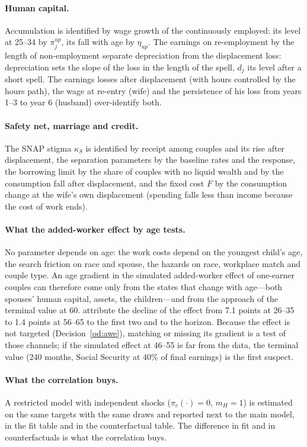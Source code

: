 \documentclass[11pt]{article}
\newcommand{\1}{\mathbf{1}}
\begin{document}
\paragraph{Human capital.} Accumulation is identified by wage growth of the continuously employed: its level at 25--34
by $\pi^{up}_j$, its fall with age by $\eta_{up}$. The
earnings on re-employment by the length of non-employment separate depreciation from the displacement loss:
depreciation sets the slope of the loss in the length of the spell, $d_j$ its level after a short spell. The earnings
losses after displacement (with hours controlled by the hours path), the wage at re-entry (wife) and the persistence of
his loss from years 1--3 to year 6 (husband) over-identify both.

\paragraph{Safety net, marriage and credit.} The SNAP stigma $\kappa_S$ is identified by receipt among couples and its
rise after displacement, the separation parameters by the baseline rates and the response, the borrowing limit by the
share of couples with no liquid wealth and by the consumption fall after displacement, and the fixed cost $F$ by the
consumption change at the wife's own displacement (spending falls less than income because the cost of work ends).

\paragraph{What the added-worker effect by age tests.} No parameter depends on age: the work costs depend on the
youngest child's age, the search friction on race and spouse, the hazards on race, workplace match and couple type.
An age gradient in the simulated added-worker effect of one-earner couples can therefore come only from the states that
change with age---both spouses' human capital, assets, the children---and from the approach of the terminal value at 60.
\citet{bacher2025joint} attribute the decline of the effect from 7.1 points at 26--35 to 1.4 points at 56--65 to the
first two and to the horizon. Because the effect is not targeted (Decision~\ref{od:awe}), matching or missing its
gradient is a test of those channels; if the simulated effect at 46--55 is far from the data, the terminal value (240
months, Social Security at 40\% of final earnings) is the first suspect.

\paragraph{What the correlation buys.} A restricted model with independent shocks ($\pi_c(\cdot) = 0$, $m_H = 1$) is
estimated on the same targets with the same draws and reported next to the main model, in the fit table and in the
counterfactual table. The difference in fit and in counterfactuals is what the correlation buys.
\end{document}
